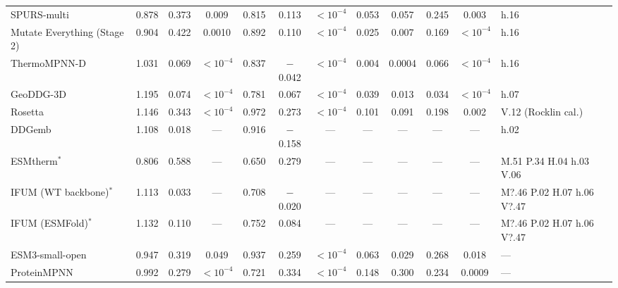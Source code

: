 \begin{table}[H]
{\begin{tabular}{lccccccccccl}
SPURS-multi & 0.878 & 0.373 & 0.009 & 0.815 & 0.113 & $<10^{-4}$ & 0.053 & 0.057 & 0.245 & 0.003 & h.16 \\
Mutate Everything (Stage 2) & 0.904 & 0.422 & 0.0010 & 0.892 & 0.110 & $<10^{-4}$ & 0.025 & 0.007 & 0.169 & $<10^{-4}$ & h.16 \\
ThermoMPNN-D & 1.031 & 0.069 & $<10^{-4}$ & 0.837 & $-$0.042 & $<10^{-4}$ & 0.004 & 0.0004 & 0.066 & $<10^{-4}$ & h.16 \\
GeoDDG-3D & 1.195 & 0.074 & $<10^{-4}$ & 0.781 & 0.067 & $<10^{-4}$ & 0.039 & 0.013 & 0.034 & $<10^{-4}$ & h.07 \\
Rosetta & 1.146 & 0.343 & $<10^{-4}$ & 0.972 & 0.273 & $<10^{-4}$ & 0.101 & 0.091 & 0.198 & 0.002 & V.12 (Rocklin cal.) \\
DDGemb & 1.108 & 0.018 & --- & 0.916 & $-$0.158 & --- & --- & --- & --- & --- & h.02 \\
ESMtherm$^*$ & 0.806 & 0.588 & --- & 0.650 & 0.279 & --- & --- & --- & --- & --- & M.51 P.34 H.04 h.03 V.06 \\
IFUM (WT backbone)$^*$ & 1.113 & 0.033 & --- & 0.708 & $-$0.020 & --- & --- & --- & --- & --- & M?.46 P.02 H.07 h.06 V?.47 \\
IFUM (ESMFold)$^*$ & 1.132 & 0.110 & --- & 0.752 & 0.084 & --- & --- & --- & --- & --- & M?.46 P.02 H.07 h.06 V?.47 \\
ESM3-small-open & 0.947 & 0.319 & 0.049 & 0.937 & 0.259 & $<10^{-4}$ & 0.063 & 0.029 & 0.268 & 0.018 & --- \\
ProteinMPNN & 0.992 & 0.279 & $<10^{-4}$ & 0.721 & 0.334 & $<10^{-4}$ & 0.148 & 0.300 & 0.234 & 0.0009 & --- \\
\bottomrule
\end{tabular}
}
\end{table}




